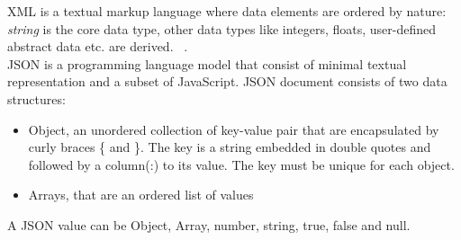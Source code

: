 XML is  a textual markup language where data elements are ordered by nature: \textit{string} is the core data type, other data types like integers, floats, user-defined abstract data etc. are derived. ~\citep{xmark/original}.
\\
JSON is a programming language model that consist of minimal textual representation and a subset of JavaScript. JSON document consists of two data structures:
\begin{itemize}
	\item Object, an unordered collection of key-value pair that are encapsulated by curly braces \{ and \}. The key is a string embedded in double quotes and followed by a column(:) to its value. The key must be unique for each object.
	\item Arrays, that are an ordered list of values
\end{itemize}
A JSON value can be Object, Array, number, string, true, false and null.

